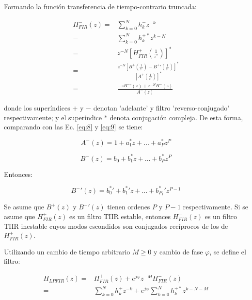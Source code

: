 \documentclass[conference]{IEEEtran}
\begin{document}
Formando la función transferencia de tiempo-contrario truncada:

\begin{align}
    H_{FIR}^{-}(z) =& \sum_{k=0}^{N}{h_{k}^{-}z^{-k}} \\
                   =& \sum_{k=0}^{N}{h_{k}^{+*} z^{k-N}} \\
                   =& z^{-N} \left[ H_{FIR}^{ +} \left( \frac{1}{z^{*}} \right) \right] ^{*} \\
                   =& \frac{z^{-N} \left[ B^{ +} \left( \frac{1}{z^{*}} \right) - B^{ +}' \left( \frac{1}{z^{*}} \right)   \right] ^{*}}{\left[ A^{ + } \left( \frac{1}{z^{*}} \right) \right] ^{*}} \\
                   =& \frac{-z B^{-}' (z) + z^{-N} B^{-}(z)}{A^{-}(z)}
\label{eq:47}
\end{align}

donde los superíndices \(+\) y \(-\) denotan 'adelante' y filtro 'reverso-conjugado' respectivamente; y el superíndice \(*\) denota conjugación compleja. De esta forma, comparando con las Ec. \ref{eq:8} y \ref{eq:9} se tiene:

\begin{equation}
    A^{-}(z) = 1 + a^{*}_1 z + \ldots + a^{*}_P z^P
\end{equation}

\begin{equation}
    B^{-}(z) = b_0 + b^{*}_1 z + \ldots + b^{*}_P z^P
\end{equation}

Entonces:

\begin{equation}
    B^{-}'(z) = b_0^{*}' + b_1^{*}' z + \ldots + b_{P_1}^{*}' z^{P-1}
\end{equation}

Se asume que \(B^{+}(z)\) y \(B^{-}'(z)\) tienen ordenes \(P\) y \(P-1\) respectivamente. Si se asume que \(H_{FIR}^{ +}(z)\) es un filtro TIIR estable, entonces \(H_{FIR}^{-}(z)\) es un filtro TIIR inestable cuyos modos escondidos son conjugados recíprocos de los de \(H_{FIR}^{ +}(z)\).

Utilizando un cambio de tiempo arbitrario \(M \geq 0\) y cambio de fase \(\varphi\), se define el filtro:

\begin{align}
    H_{LPFIR}(z) =& H_{FIR}^{ + } (z) + e^{j\varphi} z^{-M} H_{FIR}^{-}(z) \\
                 =& \sum_{k=0}^{N}{h_k^{ + } z^{-k}} + e^{j \varphi} \sum_{k=0}^{N}{h_k^{+*} z^{k-N-M}}
\end{align}
\end{document}
